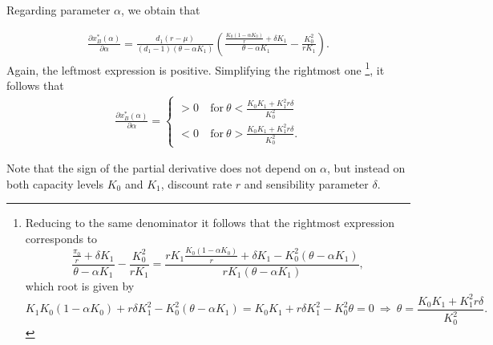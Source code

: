 Regarding parameter $\alpha$, we obtain that

\begin{align*}
\frac{\partial x^*_B ( \alpha ) }{\partial \alpha}= 
\frac{d_1 (r-\mu )}{ (d_1-1)(\theta-\alpha K_1)}  \left( \frac{\frac{K_0(1-\alpha K_0)}{r}+ \delta K_1  }{\theta-\alpha K_1} -\frac{ K_0^2}{r K_1} \right).
\end{align*}
Again, the leftmost expression is positive. Simplifying the rightmost one
\footnote{Reducing to the same denominator it follows that the rightmost expression corresponds to
	$$\frac{\frac{\pi_0}{r}+ \delta K_1  }{\theta-\alpha K_1} -\frac{ K_0^2}{r K_1} =
	\frac{r K_1 \frac{K_0(1-\alpha K_0)}{r}+ \delta K_1  -K_0^2(\theta-\alpha K_1)}{r K_1(\theta-\alpha K_1)},$$
	which root is given by 
	$$  K_1 K_0(1-\alpha K_0)+ r\delta K_1^2  -K_0^2(\theta-\alpha K_1)= K_0K_1+r\delta K_1^2-K_0^2 \theta=0 \ \Rightarrow \ \theta=\frac{K_0 K_1 +K_1^2 r\delta}{K_0^2}.
	$$
	},
it follows that
\begin{align*}
\frac{\partial x^*_B ( \alpha ) }{\partial \alpha}= 
\begin{cases}
>0 &\ \text{for} \ \theta < \frac{K_0 K_1 +K_1^2 r\delta}{K_0^2}\\
<0 &\ \text{for} \ \theta > \frac{K_0 K_1 +K_1^2 r\delta}{K_0^2}.
\end{cases}
\end{align*}

Note that the sign of the partial derivative does not depend on $\alpha$, but instead on both capacity levels $K_0$ and $K_1$, discount rate $r$ and sensibility parameter $\delta$.



